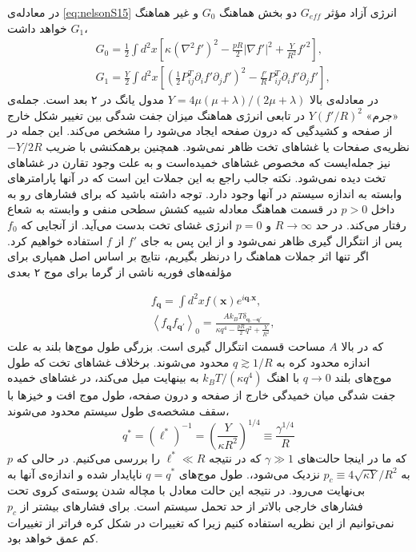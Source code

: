 در معادله‌‌ی \ref{eq:nelsonS15} 
انرژی آزاد مؤثر $G_{eff}$ دو بخش هماهنگ $G_0$ 
و غیر هماهنگ $G_1$
خواهد داشت،
\begin{equation}
\begin{aligned}
&G_0=\frac{1}{2}\int d^2x\left[\kappa(\nabla^2f')^2-\frac{pR}{2}|\nabla f'|^2+\frac{Y}{R^2}f'^2\right], \\
&G_1=\frac{Y}{2}\int d^2x\left[\left(\frac{1}{2}P_{ij}^T\partial_if'\partial_jf'\right)^2-\frac{f'}{R}P_{ij}^T\partial_if'\partial_jf'\right],
\label{eq:nelsonS16.1}
\end{aligned}
\end{equation}
در معادله‌ی بالا $Y=4\mu(\mu+\lambda)/(2\mu+\lambda)$ مدول یانگ در ۲ بعد است. جمله‌ی «جرم» $Y(f'/R)^2$ در تابعی انرژی هماهنگ میزان جفت شدگی بین تغییر شکل خارج از صفحه و کشیدگیی که درون صفحه ایجاد می‌شود را مشخص می‌کند. این جمله در نظریه‌ی صفحات یا غشاهای تخت ظاهر نمی‌شود. همچنین برهمکنشی با ضریب $-Y/2R$ نیز جمله‌ایست که مخصوص غشاهای خمیده‌است و به علت وجود تقارن در غشاهای تخت دیده نمی‌شود. نکته جالب راجع به این جملات این است که در آنها پارامترهای وابسته به اندازه سیستم در آنها وجود دارد. توجه داشته باشید که برای فشارهای رو به داخل $p>0$ در قسمت هماهنگ معادله شبیه کشش سطحی منفی و وابسته به شعاع رفتار می‌کند. در حد $R\rightarrow \infty$ و $p=0$ انرژی غشای تخت بدست می‌آید. از آنجایی که $f_0$ 
پس از انتگرال گیری ظاهر نمی‌شود و از این پس به جای 
$f'$ از 
$f$ 
استفاده خواهیم کرد. اگر تنها اثر جملات هماهنگ را درنظر بگیریم، نتایج بر اساس اصل همپاری برای مؤلفه‌های فوریه ناشی از گرما برای موج ۲ بعدی

\begin{equation}
\begin{aligned}
&f_{\boldsymbol q} = \int d^2xf(\boldsymbol x)e^{i\boldsymbol q.\boldsymbol x}, \\
&\left\langle f_{\boldsymbol q}f_{\boldsymbol {q'}}\right\rangle_0 = \frac{Ak_BT\delta_{\boldsymbol q, \boldsymbol{-q'}}}{\kappa q^4-\frac{pR}{2}q^2+\frac{Y}{R^2}},
\label{eq:nelsonS17}
\end{aligned}
\end{equation}
که در بالا $A$
مساحت قسمت انتگرال گیری است. 
بزرگی طول موج‌ها بلند به علت اندازه محدود کره به $q\gtrsim 1/R$
محدود می‌شوند. برخلاف غشاهای تخت که طول موج‌های بلند $q\rightarrow 0$
با اهنگ $k_BT/(\kappa q^4)$
به بینهایت میل می‌کند، در غشاهای خمیده جفت شدگی میان خمیدگی خارج از صفحه و درون صفحه، طول موج افت و خیزها با سقف مشخصه‌ی طول سیستم محدود می‌شوند، 
\begin{equation}
q^*=(\ell^*)^{-1}=\left(\frac{Y}{\kappa R^2}\right)^{1/4}\equiv\frac{\gamma^{1/4}}{R}
\label{eq:nelsonS17.1}
\end{equation}
که ما در اینجا حالت‌های $\gamma\gg1$
که در نتیجه $\ell^*\ll R$
را بررسی می‌کنیم. در حالی که $p$
به $p_c\equiv4\sqrt{\kappa Y}/R^2$
نزدیک می‌شود،. طول موج‌های $q=q^*$ 
ناپایدار شده و اندازه‌ی آنها به بی‌نهایت می‌رود. در نتیجه این حالت معادل با مچاله شدن پوسته‌ی کروی تحت فشارهای خارجی بالاتر از حد تحمل سیستم است. برای فشارهای بیشتر از $p_c$
نمی‌توانیم از این نظریه استفاده کنیم زیرا که تغییرات در شکل کره فراتر از تغییرات کم عمق خواهد بود.

